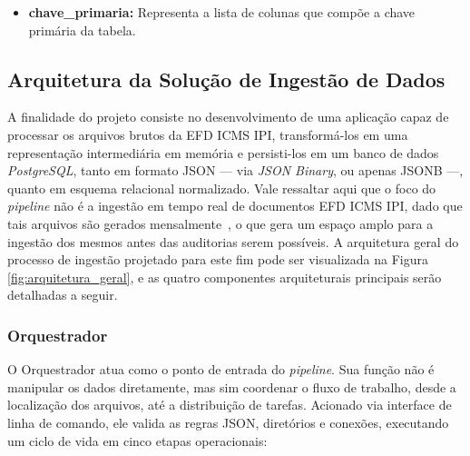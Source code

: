 \begin{itemize}
\begin{itemize}
\begin{itemize}
            presente coluna derivam de sequencial interno ao banco de dados;
            \item \textbf{externo:} Representa que os dados armazenados na
            presente coluna derivam de uma consulta que devem ser realizado em
            outra tabela do banco de dados;
            \item \textbf{registro\_pai}: Representa que os dados armazenados
            na presente coluna derivam da chave primária de um registro pai.
        \end{itemize}
        \item \textbf{extras:} Representa informações adicionais que possam ser
        necessárias para obter os dados armazenados na presente coluna. Por
        exemplo, se a \textbf{origem} é \textbf{efd}, teremos dois campos
        adicionais, um que indica qual o caminho que deve ser seguido para
        encontrar aquele o campo que contém a informação, e o nome desse campo;
    \end{itemize} 
    \item \textbf{chave\_primaria:} Representa a lista de colunas que compõe a
    chave primária da tabela.
\end{itemize}

\subsection{Arquitetura da Solução de Ingestão de Dados}
\label{sec:arquitetura_etl}

A finalidade do projeto consiste no desenvolvimento de uma aplicação capaz de
processar os arquivos brutos da EFD ICMS IPI, transformá-los em uma
representação intermediária em memória e persisti-los em um banco de dados
\textit{PostgreSQL}, tanto em formato JSON --- via \textit{JSON Binary}, ou
apenas JSONB ---, quanto em esquema relacional normalizado. Vale ressaltar aqui
que o foco do \textit{pipeline} não é a ingestão em tempo real de documentos
EFD ICMS IPI, dado que tais arquivos são gerados
mensalmente~\cite{perguntas_frequentes_efd},
o que gera um espaço amplo para a ingestão dos mesmos antes das auditorias
serem possíveis. A arquitetura geral do processo de ingestão projetado para
este fim pode ser visualizada na Figura \ref{fig:arquitetura_geral}, e as
quatro componentes arquiteturais principais serão detalhadas a seguir.



\subsubsection{Orquestrador}
O Orquestrador atua como o ponto de entrada do \textit{pipeline}. Sua função
não é manipular os dados diretamente, mas sim coordenar o fluxo de trabalho,
desde a localização dos arquivos, até a distribuição de tarefas. Acionado via
interface de linha de comando, ele valida as regras JSON, diretórios e
conexões, executando um ciclo de vida em cinco etapas operacionais:

